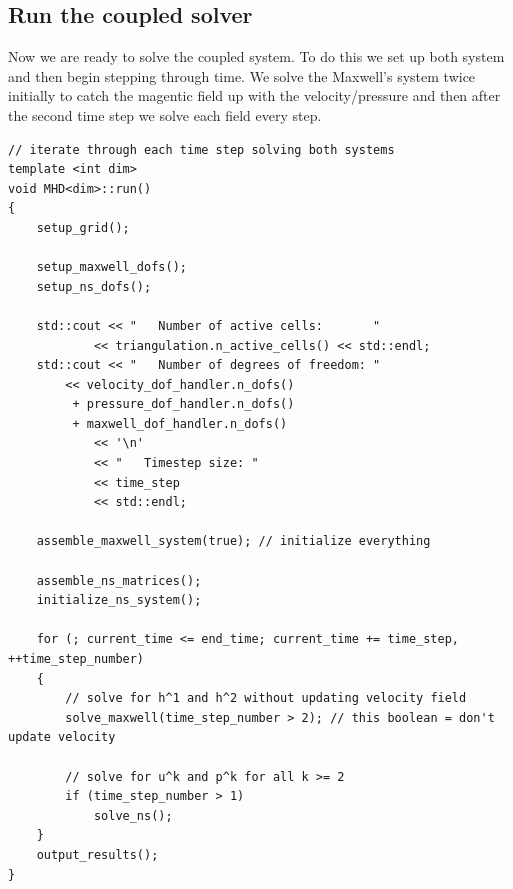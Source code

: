 \documentclass{article}
\begin{document}
\subsection*{Run the coupled solver}
Now we are ready to solve the coupled system. To do this we set up both system and then begin stepping through time. We solve the Maxwell's system twice initially to catch the magentic field up with the velocity/pressure and then after the second time step we solve each field every step. 
\begin{lstlisting}
// iterate through each time step solving both systems
template <int dim>
void MHD<dim>::run()
{
    setup_grid();

    setup_maxwell_dofs();
    setup_ns_dofs();

    std::cout << "   Number of active cells:       "
            << triangulation.n_active_cells() << std::endl;
    std::cout << "   Number of degrees of freedom: "
        << velocity_dof_handler.n_dofs()
         + pressure_dof_handler.n_dofs()
         + maxwell_dof_handler.n_dofs()
            << '\n'
            << "   Timestep size: "
            << time_step
            << std::endl;

    assemble_maxwell_system(true); // initialize everything

    assemble_ns_matrices();
    initialize_ns_system();

    for (; current_time <= end_time; current_time += time_step, ++time_step_number)
    {
        // solve for h^1 and h^2 without updating velocity field
        solve_maxwell(time_step_number > 2); // this boolean = don't update velocity

        // solve for u^k and p^k for all k >= 2
        if (time_step_number > 1)
            solve_ns();
    }
    output_results();
}
\end{lstlisting}
\end{document}
